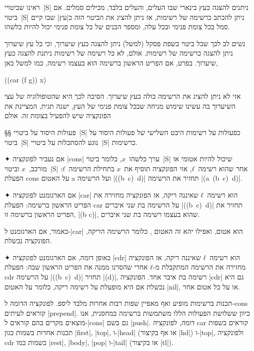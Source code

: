 ראינו שביטויי~\E|S| ניתנים להצגה כעץ בינארי שבו העלים, והעלים בלבד, מכילים
סמלים. אם ביטוי~\E|S| ניתן להכתב כרשימה של רשימות, אז ניתן להציג את הביטוי
הזה כ\ע|עץ| שבו קיים סמל בכל צומת פנימי ובכל עלה, ומספר הבנים של כל צומת פנימי
יכול להיות כלשהו.


נשים לב לכך שכל ביטוי בשפת פסקל (למשל) ניתן להצגה כעץ שיערוך, וכי כל עץ שיערוך
ניתן להצגה כרשימה של רשימות. אולם, לא כל רשימה של רשימות ניתנת להצגה כעץ
שיערוך. בפרט, אם הפריט הראשון ברשימה הוא בעצמו רשימה, כמו למשל כאן,
\begin{LISP}
((car (f g)) x)
\end{LISP}
אזי לא ניתן להציג את הרשימה כולה כעץ שיערוך. הסיבה לכך היא שהטופולוגיה של עצי
השיערוך בה עשינו שימוש מניחה שבכל צומת פנימי של העץ, ישנה תגית, המציינת את
הפונקציה שיש להפעיל בצומת זה. אולם

§§ פעולות היסוד על ביטויי~\E|S| כפעולות על רשימות
היבט השלישי של פעולות היסוד על ביטוי~\E|S| נוגע להסתכלות על ביטויי~\E|S|
כרשימות.

\begin{enumerate}
  ✦ אם נעביר לפונקציה \T|cons| ערך כלשהו~$x$, כלומר ביטוי~\E|S| שיכול להיות
  אטומי או מורכב,~$x$ וביטוי~\E|S| אחר שהוא רשימה~$ℓ$, אזי הפונקציה תוסיף
  את~$x$ בתחילת הרשימה~$ℓ$: הפעלת cons על האטום a ועל הרשימה \E|((b~c)~d)|
  תחזיר את הרשימה \E|(a~(b~c)~d)|.

  ✦ אם הארגומנט לפונקציה \T|car| הוא רשימה~$ℓ$ שאיננה ריקה, אז הפונקציה מחזירה
  את הפריט הראשון ברשימה: הפעלת car על הרשימה בת שני איברים \E|((b~c)~d)| תחזיר
  את הפריט הראשון ברשימה זו, \E|(b c)|, שהוא בעצמו רשימה בת שני איברים.

  כאמור, אם הארגומנט ל-\E|car| הוא אטום, ואפילו יהא זה האטום ,
  כלומר הרשימה הריקה, הפונקציה נכשלת.

  ✦ באופן דומה, אם הארגומנט לפונקציה \T|cdr| הוא רשימה~$ℓ$ שאיננה ריקה, אז
  הפונקציה מחזירה את הרשימה המתקבלת מ-$ℓ$ אחרי שהסרנו ממנה את הפריט הראשון שבה:
  הפעלת cdr על הרשימה \E|((b~c)~d)| תחזיר \E|(d)|, רשימה בת איבר אחד. הפונקציה
  \E|cdr| גם היא נכשלת אם היא מופעלת על רשימה ריקה, כלומר על האטום \E|nil|, או
  על כל אטום אחר.
\end{enumerate}

תכנות ברשימות מופיע ואף מאפיין שפות רבות אחרות מלבד ליספ. לפונקציה הדומה
ל-cons קוראים לעיתים \E|prepend|. כיוון ששלושת הפעולות הללו משתמשות ברשימה
כמחסנית, אנו מוצאים מקרים בהם קוראים ל-\E|cons| גם בשם \E|push|. דומה,
לפונקציה car קוראים בשפות תכנות אחרות בשמות כגון \E|first|, \E|top|, ו-\E|head|
(או אף בקיצור \E|hd|) ו-\E|top|, ולפונקציה cdr בשמות כמו \E|rest|, \E|body|,
\E|pop| ו-\E|tail| (או בקיצור \E|tl|).

